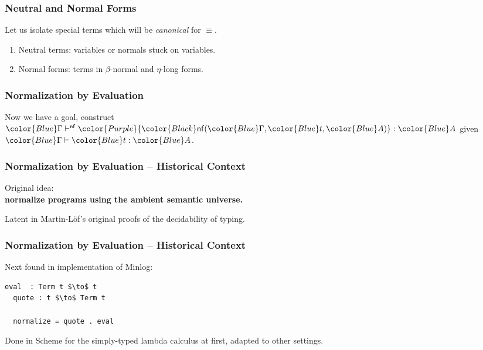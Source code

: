 \documentclass[svgnames]{beamer}
\newcommand\fmttm[1]{{\color{Blue}#1}}
\newcommand\fmtne[1]{{\color{DarkOrange}#1}}
\newcommand\fmtnf[1]{{\color{Purple}#1}}
\newcommand{\Uni}{\fmttm{\mathcal{U}}}
\newcommand{\Unit}{\fmttm{\mathsf{Unit}}}
\newcommand{\unit}{\fmttm{\mathsf{tt}}}
\newcommand{\var}[1]{\fmttm{\mathbf{x}_{\color{Black} #1}}}
\newcommand{\nevar}[1]{\fmtne{\mathbf{x}_{\color{Black} 0}}\color{Black} \{\fmtne{\uparrow}^{#1}\}}
\newcommand{\isctx}[1]{\fmttm{#1}\vdash}
\newcommand{\isterm}[3]{\fmttm{#1}\vdash\fmttm{#2}:\fmttm{#3}}
\newcommand{\isneutral}[3]{\fmttm{#1}\vdash^{\mathsf{neu}}\fmtne{#2}:\fmttm{#3}}
\newcommand{\isnormal}[3]{\fmttm{#1}\vdash^{\mathsf{nf}}\fmtnf{#2}:\fmttm{#3}}
\newcommand{\istype}[2]{\fmttm{#1}\vdash\fmttm{#2}}
\newcommand{\apsubst}[2]{\color{Black} \fmttm{#1}\{\fmttm{#2}\}}
\newcommand{\weaken}[1]{\uparrow^{\color{Black}#1}}
\newcommand{\neapp}[2]{{\color{Black} \fmtne{#1}(\fmtnf{#2})}}
\newcommand{\nf}[3]{{\color{Black} \mathsf{nf}(\fmttm{#1}, \fmttm{#2}, \fmttm{#3})}}
\begin{document}
\begin{frame}
  \frametitle{Neutral and Normal Forms}
  Let us isolate special terms which will be \emph{canonical} for $\equiv$.

  \begin{enumerate}
  \item \fmtne{Neutral terms}: variables or \fmtnf{normals} stuck on variables.
  \item \fmtnf{Normal forms}: \fmttm{terms} in $\beta$-normal and $\eta$-long forms.
  \end{enumerate}
\end{frame}

\begin{frame}
  \frametitle{Normalization by Evaluation}
  \centering
  Now we have a goal, construct $\isnormal{\Gamma}{\nf{\Gamma}{t}{A}}{A}$ given $\isterm{\Gamma}{t}{A}$.
\end{frame}
\begin{frame}
  \frametitle{Normalization by Evaluation -- Historical Context}
  \centering
  Original idea:\\ \textbf{normalize programs using the ambient semantic universe.}

  \bigskip

  Latent in Martin-L\"of's original proofs of the decidability of typing.
\end{frame}

\begin{frame}[fragile]
  \frametitle{Normalization by Evaluation -- Historical Context}
  Next found in implementation of Minlog:
\begin{lstlisting}[mathescape=true]
  eval  : Term t $\to$ t
  quote : t $\to$ Term t

  normalize = quote . eval
\end{lstlisting}
  Done in Scheme for the simply-typed lambda calculus at first, adapted to other settings.
\end{frame}
\end{document}
